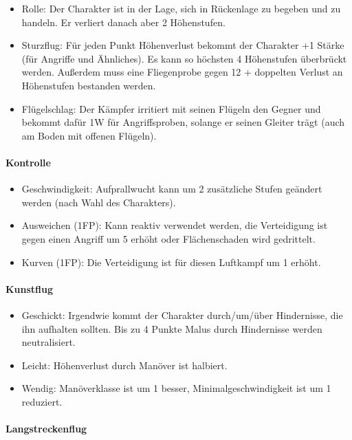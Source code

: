 \documentclass{article}
\begin{document}
\begin{itemize}
\item Rolle: Der Charakter ist in der Lage, sich in Rückenlage zu begeben und zu handeln. Er verliert danach aber 2 Höhenstufen.
\item Sturzflug: Für jeden Punkt Höhenverlust bekommt der Charakter +1 Stärke (für Angriffe und Ähnliches). Es kann so höchsten 4 Höhenstufen überbrückt werden. Außerdem muss eine Fliegenprobe gegen 12 + doppelten Verlust an Höhenstufen bestanden werden.
\item Flügelschlag: Der Kämpfer irritiert mit seinen Flügeln den Gegner und bekommt dafür 1W für Angriffsproben, solange er seinen Gleiter trägt (auch am Boden mit offenen Flügeln).
\end{itemize}

\paragraph{Kontrolle}

\begin{itemize}
\item Geschwindigkeit: Aufprallwucht kann um 2 zusätzliche Stufen geändert werden (nach Wahl des Charakters).
\item Ausweichen (1FP): Kann reaktiv verwendet werden, die Verteidigung ist gegen einen Angriff um 5 erhöht oder Flächenschaden wird gedrittelt.
\item Kurven (1FP): Die Verteidigung ist für diesen Luftkampf um 1 erhöht.
\end{itemize}

\paragraph{Kunstflug}

\begin{itemize}
\item Geschickt: Irgendwie kommt der Charakter durch/um/über Hindernisse, die ihn aufhalten sollten. Bis zu 4 Punkte Malus durch Hindernisse werden neutralisiert.
\item Leicht: Höhenverlust durch Manöver ist halbiert.
\item Wendig: Manöverklasse ist um 1 besser, Minimalgeschwindigkeit ist um 1 reduziert.
\end{itemize}

\paragraph{Langstreckenflug}
\end{document}
